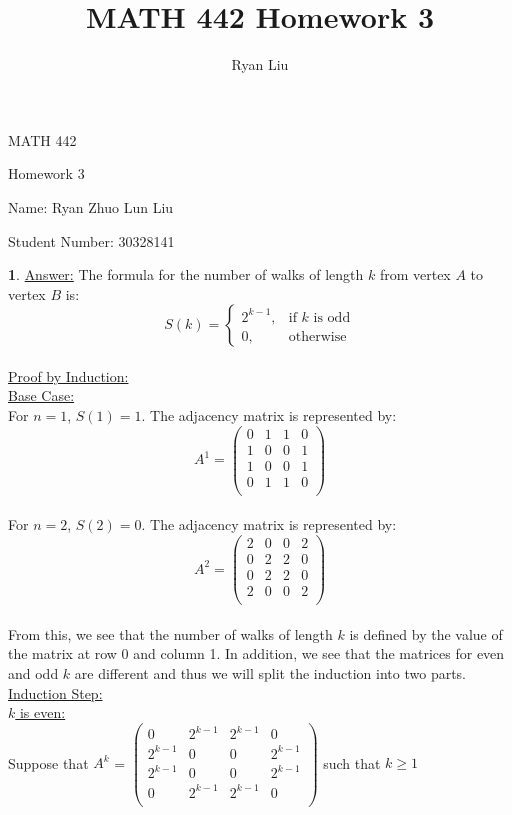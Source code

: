 \documentclass[12pt,a4paper]{article}
\author{Ryan Liu}
\title{MATH 442 Homework 3}
\theoremstyle{definition}
\newtheorem{problem}{}
\begin{document}
\begin{center}
{\huge MATH 442 \par}
{\Large Homework  3  \par}
{\normalsize Name: Ryan Zhuo Lun Liu \par}
{\normalsize Student Number: 30328141 \par}
\end{center}

\begin{problem}
\underline{Answer:} The formula for the number of walks of length $k$ from vertex $A$ to vertex $B$ is: \\

\[
    S(k) =
\begin{cases}
    2^{k - 1},& \text{if } k \text{ is odd} \\
    0,              & \text{otherwise}
\end{cases}
\] \\

\underline{Proof by Induction:} \\
\underline{Base Case:} \\
For $n = 1$, $S(1) = 1$. The adjacency matrix is represented by: \\
\[
A^1 =
\begin{pmatrix}
    0&1&1&0\\
    1&0&0&1\\
    1&0&0&1\\
    0&1&1&0\\
\end{pmatrix}
\] \\

For $n = 2$, $S(2) = 0$. The adjacency matrix is represented by: \\
\[
A^2 =
\begin{pmatrix}
    2&0&0&2\\
    0&2&2&0\\
    0&2&2&0\\
    2&0&0&2\\
\end{pmatrix}
\] \\

From this, we see that the number of walks of length $k$ is defined by the value of the matrix at row 0 and column 1. In addition, we see that the matrices for even and odd $k$ are different and thus we will split the induction into two parts.\\

\underline{Induction Step:} \\
\underline{$k$ is even:} \\
Suppose that $A^k$ = $\begin{pmatrix}
    0&2^{k - 1}&2^{k - 1}&0\\
    2^{k - 1}&0&0&2^{k - 1}\\
    2^{k - 1}&0&0&2^{k - 1}\\
    0&2^{k - 1}&2^{k - 1}&0\\
\end{pmatrix}$  such that $k \geq 1$ \\\\


\end{problem}
\end{document}
